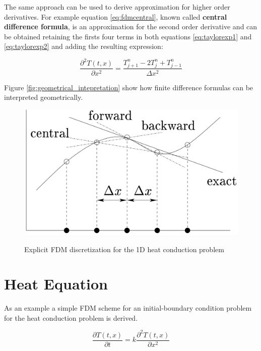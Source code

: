    The same approach can be used to derive approximation for higher order derivatives.
   For example equation \ref{eq:fdmcentral}, known called \textbf{central difference formula}, is an approximation for the second order derivative and can be obtained retaining the firsts four terms in both equations \ref{eq:taylorexp1} and \ref{eq:taylorexp2} and adding the resulting expression:
   
    \begin{equation}
		\frac{\partial^2 T(t,x)}{\partial x^2} = \frac{T^n_{j+1}- 2T^n_{j} + T^n_{j-1}}{\Delta x^2}
		\label{eq:fdmcentral}
    \end{equation}
    
    Figure \ref{fig:geometrical_intepretation} show how finite difference formulas can be interpreted geometrically.
    \begin{figure}
\centering
\includegraphics[scale=0.3]{./images/CA_FDM/geometrical_interpretation_fd}
\label{fig:geometrical_intepretation}
\caption{Explicit FDM discretization for the 1D heat conduction problem}\label{torus}
\end{figure} 
    
    \section{Heat Equation}
        As an example a simple FDM scheme for an initial-boundary condition problem for the heat conduction problem is derived. 
    
\begin{equation}
    \frac{\partial T(t,x)}{\partial t}= k\frac{\partial^2
      T(t,x)}{\partial x^2}
      \label{eq:heatconduction}
\end{equation}
 
